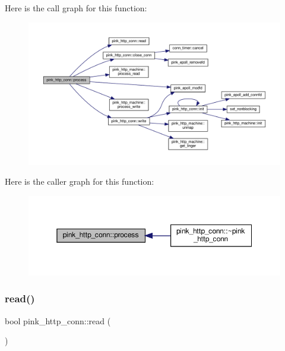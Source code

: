 Here is the call graph for this function\+:
\nopagebreak
\begin{figure}[H]
\begin{center}
\leavevmode
\includegraphics[width=350pt]{classpink__http__conn_a41ca12d76d0056562633f27d456d0b62_cgraph}
\end{center}
\end{figure}
Here is the caller graph for this function\+:
\nopagebreak
\begin{figure}[H]
\begin{center}
\leavevmode
\includegraphics[width=350pt]{classpink__http__conn_a41ca12d76d0056562633f27d456d0b62_icgraph}
\end{center}
\end{figure}
\mbox{\label{classpink__http__conn_a254c09e8b962e5a0bc116f8da271b5ed}} 
\subsubsection{\texorpdfstring{read()}{read()}}
{\footnotesize\ttfamily bool pink\+\_\+http\+\_\+conn\+::read (\begin{DoxyParamCaption}{ }\end{DoxyParamCaption})}



